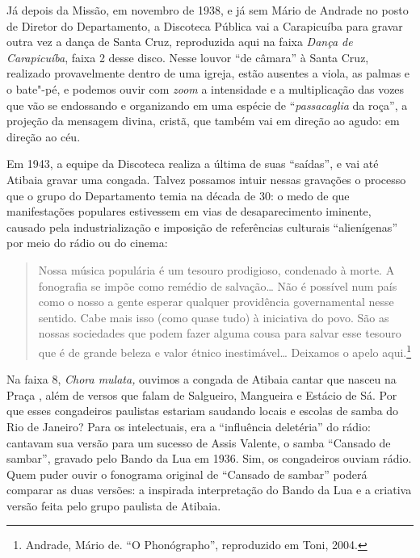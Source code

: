 Já depois da Missão, em novembro de 1938, e já sem Mário de Andrade no
posto de Diretor do Departamento, a Discoteca Pública vai a Carapicuíba
para gravar outra vez a dança de Santa Cruz, reproduzida aqui na faixa
\emph{Dança de Carapicuíba}, faixa 2 desse disco. Nesse louvor ``de
câmara'' à Santa Cruz, realizado provavelmente dentro de uma igreja,
estão ausentes a viola, as palmas e o bate"-pé, e podemos ouvir com
\emph{zoom} a intensidade e a multiplicação das vozes que vão se
endossando e organizando em uma espécie de ``\emph{passacaglia} da
roça'', a projeção da mensagem divina, cristã, que também vai em direção
ao agudo: em direção ao céu.

Em 1943, a equipe da Discoteca realiza a última de suas ``saídas'', e
vai até Atibaia gravar uma congada. Talvez possamos intuir nessas
gravações o processo que o grupo do Departamento temia na década de 30:
o medo de que manifestações populares estivessem em vias de
desaparecimento iminente, causado pela industrialização e imposição de
referências culturais ``alienígenas'' por meio do rádio ou do cinema:

\begin{quote}
Nossa música populária é um tesouro prodigioso, condenado à morte. A
fonografia se impõe como remédio de salvação\ldots{} Não é possível num
país como o nosso a gente esperar qualquer providência governamental
nesse sentido. Cabe mais isso (como quase tudo) à iniciativa do povo.
São as nossas sociedades que podem fazer alguma cousa para salvar esse
tesouro que é de grande beleza e valor étnico inestimável\ldots{} Deixamos o
apelo aqui.\footnote{Andrade, Mário de. ``O Phonógrapho'',
  reproduzido em Toni, 2004.}
\end{quote}

Na faixa 8, \emph{Chora mulata,} ouvimos a congada de Atibaia cantar que
nasceu na Praça , além de versos que falam de Salgueiro, Mangueira e
Estácio de Sá. Por que esses congadeiros paulistas estariam saudando
locais e escolas de samba do Rio de Janeiro? Para os intelectuais, era a
``influência deletéria'' do rádio: cantavam sua versão para um sucesso
de Assis Valente, o samba ``Cansado de sambar'', gravado pelo Bando da
Lua em 1936. Sim, os congadeiros ouviam rádio. Quem puder ouvir o
fonograma original de ``Cansado de sambar'' poderá comparar as duas
versões: a inspirada interpretação do Bando da Lua e a criativa versão
feita pelo grupo paulista de Atibaia.

